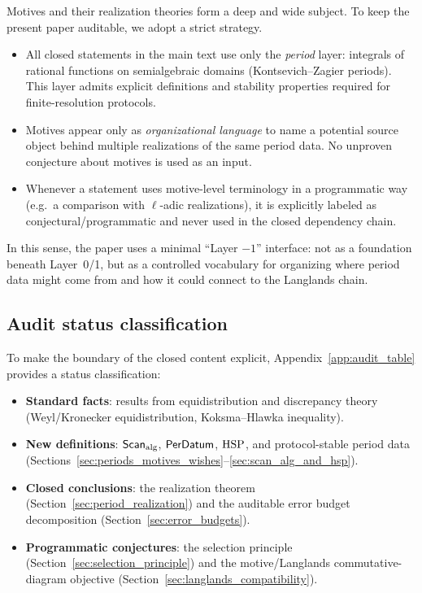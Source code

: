 Motives and their realization theories form a deep and wide subject. To keep the present paper auditable, we adopt a strict strategy.
\begin{itemize}
\item All closed statements in the main text use only the \emph{period} layer: integrals of rational functions on semialgebraic domains (Kontsevich--Zagier periods). This layer admits explicit definitions and stability properties required for finite-resolution protocols.
\item Motives appear only as \emph{organizational language} to name a potential source object behind multiple realizations of the same period data. No unproven conjecture about motives is used as an input.
\item Whenever a statement uses motive-level terminology in a programmatic way (e.g.\ a comparison with $\ell$-adic realizations), it is explicitly labeled as conjectural/programmatic and never used in the closed dependency chain.
\end{itemize}

In this sense, the paper uses a minimal ``Layer $-1$'' interface: not as a foundation beneath Layer~0/1, but as a controlled vocabulary for organizing where period data might come from and how it could connect to the Langlands chain.

\subsection{Audit status classification}
\label{sec:audit_status}

To make the boundary of the closed content explicit, Appendix~\ref{app:audit_table} provides a status classification:
\begin{itemize}
\item \textbf{Standard facts}: results from equidistribution and discrepancy theory (Weyl/Kronecker equidistribution, Koksma--Hlawka inequality).
\item \textbf{New definitions}: $\mathsf{Scan}_{\mathrm{alg}}$, $\mathsf{PerDatum}$, $\mathrm{HSP}$, and protocol-stable period data (Sections~\ref{sec:periods_motives_wishes}--\ref{sec:scan_alg_and_hsp}).
\item \textbf{Closed conclusions}: the realization theorem (Section~\ref{sec:period_realization}) and the auditable error budget decomposition (Section~\ref{sec:error_budgets}).
\item \textbf{Programmatic conjectures}: the selection principle (Section~\ref{sec:selection_principle}) and the motive/Langlands commutative-diagram objective (Section~\ref{sec:langlands_compatibility}).
\end{itemize}


